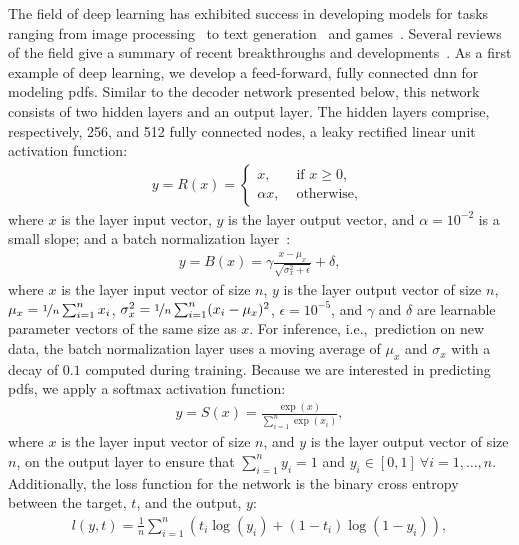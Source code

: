 \documentclass[review]{elsarticle}
\begin{document}
The field of deep learning has exhibited success in developing models
for tasks ranging from image
processing~\cite{Goodfellow2014,Burger2012,Dosovitskiy2015,Lefkimmiatis2016,Ledig2017,Tai2017,Lai2017}
to text generation~\cite{Graves2013,Wu2016,Kwon2017} and
games~\cite{Silver2017}. Several reviews of the field give a summary
of recent breakthroughs and developments~\cite{Lecun2015,
  Schmidhuber2015, Prieto2016, Goodfellow2016, Liu2017}. As a first
example of deep learning, we develop a feed-forward, fully connected
\gls{dnn} for modeling \glspl{pdf}. Similar to the decoder
network presented below, this network consists of two hidden layers
and an output layer. The hidden layers comprise,
respectively, 256, and 512 fully connected nodes, a leaky rectified
linear unit activation function:
\begin{align}
  \label{eq:relu}
  y = R(x) =
  \begin{cases}
    x, & \text{ if } x \geq 0, \\
    \alpha x, & \text{ otherwise, }
  \end{cases}
\end{align}
where $x$ is the layer input vector, $y$ is the layer output vector,
and $\alpha=10^{-2}$ is a small slope; and a batch normalization
layer~\cite{Ioffe2015}:
\begin{align}
  \label{eq:bn}
  y = B(x) = \gamma \frac{x - \mu_x}{\sqrt{\sigma_x^2 + \epsilon}} + \delta,
\end{align}
where $x$ is the layer input vector of size $n$, $y$ is the layer
output vector of size $n$, $\mu_x = \nicefrac{1}{n} \sum_{i=1}^n x_i$,
$\sigma_x^2 = \nicefrac{1}{n} \sum_{i=1}^n (x_i - \mu_x)^2$,
$\epsilon = 10^{-5}$, and $\gamma$ and $\delta$ are learnable
parameter vectors of the same size as $x$. For inference, i.e.,\
prediction on new data, the batch normalization layer uses a moving
average of $\mu_x$ and $\sigma_x$ with a decay of $0.1$ computed
during training. Because we are interested in predicting \glspl{pdf}, we apply a softmax activation function:
\begin{align}
  y = S(x) = \frac{\exp{(x)}}{\sum^n_{i=1} \exp{(x_i)}},
\end{align}
where $x$ is the layer input vector of size $n$, and $y$ is the layer
output vector of size $n$, on the output layer to ensure
that $\sum^n_{i=1} y_i = 1$ and
$y_i \in [0,1]~\forall i = 1, \dots, n$. Additionally, the loss
function for the network is the binary cross entropy between the
target, $t$, and the output, $y$:
\begin{align}
  l(y,t) = \frac{1}{n} \sum_{i=1}^n{\left( t_i \log{(y_i)}+(1-t_i) \log(1-y_i) \right)},
\end{align}
\end{document}
